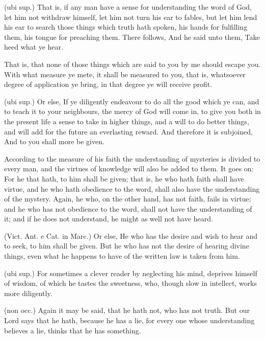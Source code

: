  (ubi sup.) That is, if any man have a sense for understanding the word of God, let him not withdraw himself, let him not turn his ear to fables, but let him lend his ear to search those things which truth hath spoken, his hands for fulfilling them, his tongue for preaching them. There follows, And he said unto them, Take heed what ye hear.

 That is, that none of those things which are said to you by me should escape you. With what measure ye mete, it shall be measured to you, that is, whatsoever degree of application ye bring, in that degree ye will receive profit.

 (ubi sup.) Or else, If ye diligently endeavour to do all the good which ye can, and to teach it to your neighbours, the mercy of God will come in, to give you both in the present life a sense to take in higher things, and a will to do better things, and will add for the future an everlasting reward. And therefore it is subjoined, And to you shall more be given.

 According to the measure of his faith the understanding of mysteries is divided to every man, and the virtues of knowledge will also be added to them. It goes on: For he that hath, to him shall be given; that is, he who hath faith shall have virtue, and he who hath obedience to the word, shall also have the understanding of the mystery. Again, he who, on the other hand, has not faith, fails in virtue; and he who has not obedience to the word, shall not have the understanding of it; and if he does not understand, he might as well not have heard.

 (Vict. Ant. e Cat. in Marc.) Or else, He who has the desire and wish to hear and to seek, to him shall be given. But he who has not the desire of hearing divine things, even what he happens to have of the written law is taken from him.

 (ubi sup.) For sometimes a clever reader by neglecting his mind, deprives himself of wisdom, of which he tastes the sweetness, who, though slow in intellect, works more diligently.

 (non occ.) Again it may be said, that he hath not, who has not truth. But our Lord says that he hath, because he has a lie, for every one whose understanding believes a lie, thinks that he has something.

 

